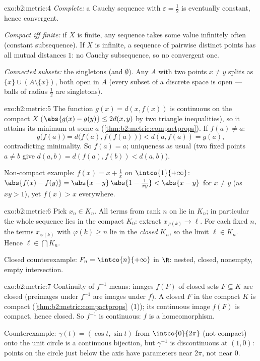 \begin{solution}{exo:b2:metric:4}
\emph{Complete:} a Cauchy sequence with $\varepsilon = \frac12$ is
eventually constant, hence convergent.

\emph{Compact iff finite:} if $X$ is finite, any sequence takes some
value infinitely often (constant subsequence). If $X$ is infinite,
a sequence of pairwise distinct points has all mutual distances $1$:
no Cauchy subsequence, so no convergent one.

\emph{Connected subsets:} the singletons (and $\emptyset$). Any $A$
with two points $x \neq y$ splits as $\{x\} \cup (A
\setminus\{x\})$, both open in $A$ (every subset of a discrete
space is open --- balls of radius $\frac12$ are singletons).
\end{solution}

\begin{solution}{exo:b2:metric:5}
The function $g(x) = d(x, f(x))$ is continuous on the compact $X$
($\abs{g(x) - g(y)} \leq 2d(x,y)$ by two triangle inequalities), so
it attains its minimum at some $a$
(\cref{thm:b2:metric:compactprops}). If $f(a) \neq a$:
\[
g\bigl(f(a)\bigr) = d\bigl(f(a), f(f(a))\bigr) < d(a, f(a)) = g(a),
\]
contradicting minimality. So $f(a) = a$; uniqueness as usual (two
fixed points $a \neq b$ give $d(a,b) = d(f(a), f(b)) < d(a,b)$).

Non-compact example: $f(x) = x + \frac1x$ on $\intco{1}{+\infty}$:
$\abs{f(x) - f(y)} = \abs{x - y}\,\abs{1 - \frac{1}{xy}} < \abs{x -
y}$ for $x \neq y$ (as $xy > 1$), yet $f(x) > x$ everywhere.
\end{solution}

\begin{solution}{exo:b2:metric:6}
Pick $x_n \in K_n$. All terms from rank $n$ on lie in $K_n$; in
particular the whole sequence lies in the compact $K_0$: extract
$x_{\varphi(k)} \to \ell$. For each fixed $n$, the terms
$x_{\varphi(k)}$ with $\varphi(k) \geq n$ lie in the \emph{closed}
$K_n$, so the limit $\ell \in K_n$. Hence $\ell \in \bigcap K_n$.

Closed counterexample: $F_n = \intco{n}{+\infty}$ in $\R$: nested,
closed, nonempty, empty intersection.
\end{solution}

\begin{solution}{exo:b2:metric:7}
Continuity of $f^{-1}$ means: images $f(F)$ of closed sets $F
\subseteq K$ are closed (preimages under $f^{-1}$ are images under
$f$). A closed $F$ in the compact $K$ is compact
(\cref{thm:b2:metric:compactprops}~(1)); its continuous image
$f(F)$ is compact, hence closed. So $f^{-1}$ is continuous: $f$ is
a homeomorphism.

Counterexample: $\gamma(t) = (\cos t, \sin t)$ from
$\intco{0}{2\pi}$ (not compact) onto the unit circle is a
continuous bijection, but $\gamma^{-1}$ is discontinuous at $(1,0)$:
points on the circle just below the axis have parameters near
$2\pi$, not near $0$.
\end{solution}

